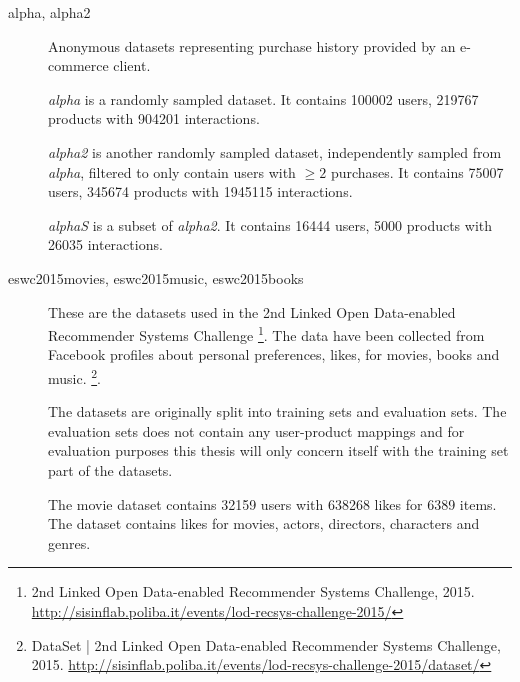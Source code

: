 \FloatBarrier

\begin{description}
    \item[alpha, alpha2] \hfill

        Anonymous datasets representing purchase history provided by an e-commerce client.

        \textit{alpha} is a randomly sampled dataset. It contains 100002 users, 219767 products with 904201 interactions.

        \textit{alpha2} is another randomly sampled dataset, independently sampled from \textit{alpha}, filtered to only contain users with $\geq 2$ purchases. It contains 75007 users, 345674 products with 1945115 interactions.

        \textit{alphaS} is a subset of \textit{alpha2}. It contains 16444 users, 5000 products with 26035 interactions.




    \item[eswc2015movies, eswc2015music, eswc2015books] \hfill

        These are the datasets used in the 2nd Linked Open Data-enabled Recommender Systems Challenge
        \footnote{2nd Linked Open Data-enabled Recommender Systems Challenge, 2015. \url{http://sisinflab.poliba.it/events/lod-recsys-challenge-2015/}}.
        The data have been collected from Facebook profiles about personal preferences, likes, for movies, books and music.
        \footnote{DataSet | 2nd Linked Open Data-enabled Recommender Systems Challenge, 2015. \url{http://sisinflab.poliba.it/events/lod-recsys-challenge-2015/dataset/}}.

        The datasets are originally split into training sets and evaluation sets. The evaluation sets does not contain any user-product mappings and for evaluation purposes this thesis will only concern itself with the training set part of the datasets.

        The movie dataset contains 32159 users with 638268 likes for 6389 items. The dataset contains likes for movies, actors, directors, characters and genres.


\end{description}
